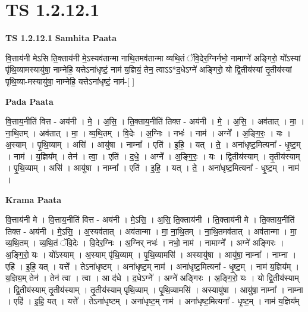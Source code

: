 \documentclass[17pt]{extarticle}
\begin{document}
\section{ TS 1.2.12.1 }

\textbf{TS 1.2.12.1 } \newline
\textbf{Samhita Paata} \newline

वि॒त्ताय॑नी मेऽसि ति॒क्ताय॑नी मे॒ऽस्यव॑तान्मा नाथि॒तमव॑तान्मा व्यथि॒तं ॅवि॒देर॒ग्निर्नभो॒ नामाग्ने॑ अङ्गिरो॒ यो᳚ऽस्यां पृ॑थि॒व्यामस्यायु॑षा॒ नाम्नेहि॒ यत्तेऽना॑धृष्टं॒ नाम॑ य॒ज्ञियं॒ तेन॒ त्वाऽऽ*द॒धेऽग्ने॑ अङ्गिरो॒ यो द्वि॒तीय॑स्यां तृ॒तीय॑स्यां पृथि॒व्या-मस्यायु॑षा॒ नाम्नेहि॒ यत्तेऽना॑धृष्टं॒ नाम॑-[ ] \newline

\textbf{Pada Paata} \newline

वि॒त्ताय॒नीति॑ वित्त - अय॑नी । मे॒ । अ॒सि॒ । ति॒क्ताय॒नीति॑ तिक्त - अय॑नी । मे॒ । अ॒सि॒ । अव॑तात् । मा॒ । ना॒थि॒तम् । अव॑तात् । मा॒ । व्य॒थि॒तम् । वि॒देः । अ॒ग्निः । नभः॑ । नाम॑ । अग्ने᳚ । अ॒ङ्गि॒रः॒ । यः । अ॒स्याम् । पृ॒थि॒व्याम् । असि॑ । आयु॑षा । नाम्ना᳚ । एति॑ । इ॒हि॒ । यत् । ते॒ । अना॑धृष्ट॒मित्यना᳚ - धृ॒ष्ट॒म् । नाम॑ । य॒ज्ञिय᳚म् । तेन॑ । त्वा॒ । एति॑ । द॒धे॒ । अग्ने᳚ । अ॒ङ्गि॒रः॒ । यः । द्वि॒तीय॑स्याम् । तृ॒तीय॑स्याम् । पृ॒थि॒व्याम् । असि॑ । आयु॑षा । नाम्ना᳚ । एति॑ । इ॒हि॒ । यत् । ते॒ । अना॑धृष्ट॒मित्यना᳚ - धृ॒ष्ट॒म् । नाम॑ ।  \newline


\textbf{Krama Paata} \newline

वि॒त्ताय॑नी मे । वि॒त्ताय॒नीति॑ वित्त - अय॑नी । मे॒ऽसि॒ । अ॒सि॒ ति॒क्ताय॑नी । ति॒क्ताय॑नी मे । ति॒क्ताय॒नीति॑ तिक्त - अय॑नी । मे॒ऽसि॒ । अ॒स्यव॑तात् । अव॑तान्मा । मा॒ ना॒थि॒तम् । ना॒थि॒तमव॑तात् । अव॑तान्मा । मा॒ व्य॒थि॒तम् । व्य॒थि॒तं ॅवि॒देः । वि॒देर॒ग्निः । अ॒ग्निर् नभः॑ । नभो॒ नाम॑ । नामाग्ने᳚ । अग्ने॑ अङ्गिरः । अ॒ङ्गि॒रो॒ यः । यो᳚ऽस्याम् । अ॒स्याम् पृ॑थि॒व्याम् । पृ॒थि॒व्यामसि॑ । अस्यायु॑षा । आयु॑षा॒ नाम्ना᳚ । नाम्ना । एहि॑ । इ॒हि॒ यत् । यत्ते᳚ । तेऽना॑धृष्टम् । अना॑धृष्ट॒म् नाम॑ । अना॑धृष्ट॒मित्यना᳚ - धृ॒ष्ट॒म् । नाम॑ य॒ज्ञिय᳚म् । य॒ज्ञिय॒म् तेन॑ । तेन॑ त्वा । त्वा । आ द॑धे । द॒धेऽग्ने᳚ । अग्ने॑ अङ्गिरः । अ॒ङ्गि॒रो॒ यः । यो द्वि॒तीय॑स्याम् । द्वि॒तीय॑स्याम् तृ॒तीय॑स्याम् । तृ॒तीय॑स्याम् पृथि॒व्याम् । पृ॒थि॒व्यामसि॑ । अस्यायु॑षा । आयु॑षा॒ नाम्ना᳚ । नाम्ना । एहि॑ । इ॒हि॒ यत् । यत्ते᳚ । तेऽना॑धृष्टम् । अना॑धृष्ट॒म् नाम॑ । अना॑धृष्ट॒मित्यना᳚ - धृ॒ष्ट॒म् । नाम॑ य॒ज्ञिय᳚म् \newline
\end{document}
